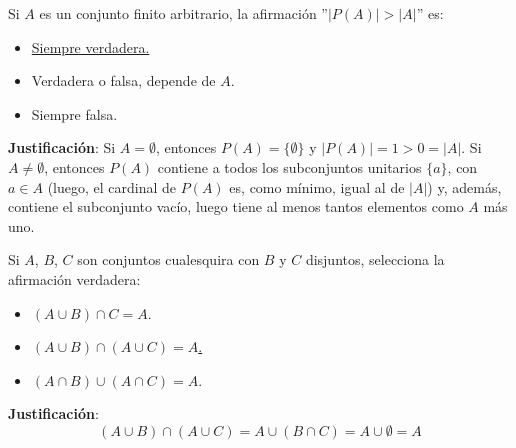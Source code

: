 \documentclass[12pt]{article}
\newcounter{ejercicio}[section] %
\newcounter{ejercicio}
\begin{document}
    \begin{ejercicio}
        Si $A$ es un conjunto finito arbitrario, la afirmación ''$|P(A)| > |A|$'' es:
        \begin{itemize}
            \item \underline{Siempre verdadera.}
            \item Verdadera o falsa, depende de $A$.
            \item Siempre falsa.
        \end{itemize}

        \noindent
        \textbf{Justificación}:
        Si $A = \emptyset$, entonces $P(A) = \{\emptyset\}$ y $|P(A)|=1>0=|A|$.\newline
        Si $A \neq \emptyset$, entonces $P(A)$ contiene a todos los subconjuntos unitarios $\{a\}$, con $a \in A$ (luego, el cardinal de $P(A)$ es, como mínimo, igual al de $|A|$) y, además, contiene el subconjunto vacío, luego tiene al menos tantos elementos como $A$ más uno.
    \end{ejercicio}

    \begin{ejercicio}
        Si $A$, $B$, $C$ son conjuntos cualesquira con $B$ y $C$ disjuntos, selecciona la afirmación verdadera:
        \begin{itemize}
            \item $(A \cup B)\cap C = A$.
            \item \underline{$(A \cup B)\cap (A \cup C)=A$.}
            \item $(A\cap B)\cup(A \cap C)=A$.
        \end{itemize}

        \noindent
        \textbf{Justificación}:
        $$(A \cup B) \cap (A \cup C) = A \cup (B \cap C) = A \cup \emptyset = A$$

    \end{ejercicio}
\end{document}

